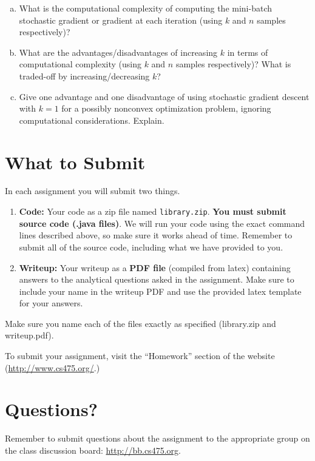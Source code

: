 \documentclass[11pt]{article}
\begin{document}
\begin{enumerate}[(a)]
\item What is the computational complexity of computing the mini-batch stochastic gradient or gradient at each iteration (using $k$ and $n$ samples respectively)?
\item What are the advantages/disadvantages of increasing $k$ in terms of computational complexity (using $k$ and $n$ samples respectively)? What is traded-off by increasing/decreasing $k$?
\item Give one advantage and one disadvantage of using stochastic gradient
descent with $k=1$ for a possibly nonconvex optimization problem, ignoring computational considerations.  Explain.
\end{enumerate}


\section{What to Submit}
In each assignment you will submit two things.
\begin{enumerate}
\item {\bf Code:} Your code as a zip file named {\tt library.zip}. {\bf You must submit source code (.java files)}. We will run your code using the exact command lines described above, so make sure it works ahead of time. Remember to submit all of the source code, including what we have provided to you.
\item {\bf Writeup:} Your writeup as a {\bf PDF file} (compiled from latex) containing answers to the analytical questions asked in the assignment. Make sure to include your name in the writeup PDF and use the provided latex template for your answers.
\end{enumerate}
Make sure you name each of the files exactly as specified (library.zip and writeup.pdf).

To submit your assignment, visit the ``Homework'' section of the website (\href{http://www.cs475.org/}{http://www.cs475.org/}.)

\section{Questions?}
Remember to submit questions about the assignment to the appropriate group on the class discussion board: \href{http://bb.cs475.org/}{http://bb.cs475.org}.
\end{document}
